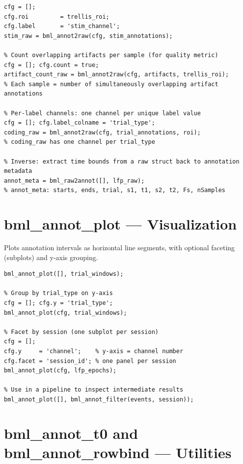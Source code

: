 \documentclass[11pt, a4paper]{article}
\begin{document}
\begin{lstlisting}[style=matlab]
% Create binary stimulus presence signal (for cross-correlation with neural data)
cfg = [];
cfg.roi         = trellis_roi;
cfg.label       = 'stim_channel';
stim_raw = bml_annot2raw(cfg, stim_annotations);

% Count overlapping artifacts per sample (for quality metric)
cfg = []; cfg.count = true;
artifact_count_raw = bml_annot2raw(cfg, artifacts, trellis_roi);
% Each sample = number of simultaneously overlapping artifact annotations

% Per-label channels: one channel per unique label value
cfg = []; cfg.label_colname = 'trial_type';
coding_raw = bml_annot2raw(cfg, trial_annotations, roi);
% coding_raw has one channel per trial_type

% Inverse: extract time bounds from a raw struct back to annotation metadata
annot_meta = bml_raw2annot([], lfp_raw);
% annot_meta: starts, ends, trial, s1, t1, s2, t2, Fs, nSamples
\end{lstlisting}

\section{bml\_annot\_plot --- Visualization}
\label{sec:plot}

Plots annotation intervals as horizontal line segments, with optional faceting (subplots) and y-axis grouping.

\begin{lstlisting}[style=matlab]
% Basic: one line per annotation id
bml_annot_plot([], trial_windows);

% Group by trial_type on y-axis
cfg = []; cfg.y = 'trial_type';
bml_annot_plot(cfg, trial_windows);

% Facet by session (one subplot per session)
cfg = [];
cfg.y     = 'channel';    % y-axis = channel number
cfg.facet = 'session_id'; % one panel per session
bml_annot_plot(cfg, lfp_epochs);

% Use in a pipeline to inspect intermediate results
bml_annot_plot([], bml_annot_filter(events, session));
\end{lstlisting}

\section{bml\_annot\_t0 and bml\_annot\_rowbind --- Utilities}
\label{sec:utils}
\end{document}
